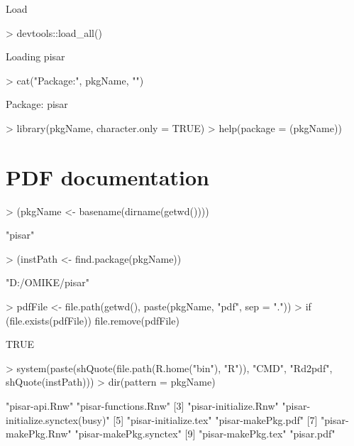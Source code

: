 \documentclass[a4paper,12pt]{article}\usepackage[]{graphicx}\usepackage[]{color}
\begin{document}
Load
\begin{Schunk}
\begin{Sinput}
> devtools::load_all()
\end{Sinput}
\begin{Soutput}
Loading pisar
\end{Soutput}
\begin{Sinput}
> cat("Package:", pkgName, "\n")
\end{Sinput}
\begin{Soutput}
Package: pisar 
\end{Soutput}
\begin{Sinput}
> library(pkgName, character.only = TRUE)
> help(package = (pkgName))
\end{Sinput}
\end{Schunk}

\section{PDF documentation}

\begin{Schunk}
\begin{Sinput}
> (pkgName <- basename(dirname(getwd())))
\end{Sinput}
\begin{Soutput}
[1] "pisar"
\end{Soutput}
\begin{Sinput}
> (instPath <- find.package(pkgName))
\end{Sinput}
\begin{Soutput}
[1] "D:/OMIKE/pisar"
\end{Soutput}
\begin{Sinput}
> pdfFile <- file.path(getwd(), paste(pkgName, "pdf", sep = "."))
> if (file.exists(pdfFile)) file.remove(pdfFile)
\end{Sinput}
\begin{Soutput}
[1] TRUE
\end{Soutput}
\begin{Sinput}
> system(paste(shQuote(file.path(R.home("bin"), "R")), "CMD", "Rd2pdf", shQuote(instPath)))
> dir(pattern = pkgName)
\end{Sinput}
\begin{Soutput}
 [1] "pisar-api.Rnw"                  "pisar-functions.Rnw"           
 [3] "pisar-initialize.Rnw"           "pisar-initialize.synctex(busy)"
 [5] "pisar-initialize.tex"           "pisar-makePkg.pdf"             
 [7] "pisar-makePkg.Rnw"              "pisar-makePkg.synctex"         
 [9] "pisar-makePkg.tex"              "pisar.pdf"                     
\end{Soutput}
\end{Schunk}
\end{document}
